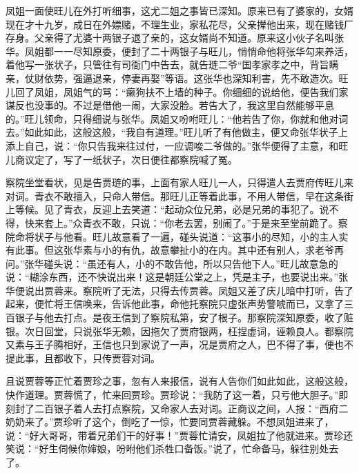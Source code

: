 凤姐一面使旺儿在外打听细事，这尤二姐之事皆已深知。原来已有了婆家的，女婿现在才十九岁，成日在外嫖赌，不理生业，家私花尽，父亲撵他出来，现在赌钱厂存身。父亲得了尤婆十两银子退了亲的，这女婿尚不知道。原来这小伙子名叫张华。凤姐都一一尽知原委，便封了二十两银子与旺儿，悄悄命他将张华勾来养活，着他写一张状子，只管往有司衙门中告去，就告琏二爷“国孝家孝之中，背旨瞒亲，仗财依势，强逼退亲，停妻再娶”等语。这张华也深知利害，先不敢造次。旺儿回了凤姐，凤姐气的骂：“癞狗扶不上墙的种子。你细细的说给他，便告我们家谋反也没事的。不过是借他一闹，大家没脸。若告大了，我这里自然能够平息的。”旺儿领命，只得细说与张华。凤姐又吩咐旺儿：“他若告了你，你就和他对词去。”如此如此，这般这般，“我自有道理。”旺儿听了有他做主，便又命张华状子上添上自己，说：“你只告我来往过付，一应调唆二爷做的。”张华便得了主意，和旺儿商议定了，写了一纸状子，次日便往都察院喊了冤。

察院坐堂看状，见是告贾琏的事，上面有家人旺儿一人，只得遣人去贾府传旺儿来对词。青衣不敢擅入，只命人带信。那旺儿正等着此事，不用人带信，早在这条街上等候。见了青衣，反迎上去笑道：“起动众位兄弟，必是兄弟的事犯了。说不得，快来套上。”众青衣不敢，只说：“你老去罢，别闹了。”于是来至堂前跪了。察院命将状子与他看。旺儿故意看了一遍，碰头说道：“这事小的尽知，小的主人实有此事。但这张华素与小的有仇，故意攀扯小的在内。其中还有别人，求老爷再问。”张华碰头说：“虽还有人，小的不敢告他，所以只告他下人。”旺儿故意急的说：“糊涂东西，还不快说出来！这是朝廷公堂之上，凭是主子，也要说出来。”张华便说出贾蓉来。察院听了无法，只得去传贾蓉。凤姐又差了庆儿暗中打听，告了起来，便忙将王信唤来，告诉他此事，命他托察院只虚张声势警唬而已，又拿了三百银子与他去打点。是夜王信到了察院私第，安了根子。那察院深知原委，收了赃银。次日回堂，只说张华无赖，因拖欠了贾府银两，枉捏虚词，诬赖良人。都察院又素与王子腾相好，王信也只到家说了一声，况是贾府之人，巴不得了事，便也不提此事，且都收下，只传贾蓉对词。

且说贾蓉等正忙着贾珍之事，忽有人来报信，说有人告你们如此如此，这般这般，快作道理。贾蓉慌了，忙来回贾珍。贾珍说：“我防了这一着，只亏他大胆子。”即刻封了二百银子着人去打点察院，又命家人去对词。正商议之间，人报：“西府二奶奶来了。”贾珍听了这个，倒吃了一惊，忙要同贾蓉藏躲。不想凤姐进来了，说：“好大哥哥，带着兄弟们干的好事！”贾蓉忙请安，凤姐拉了他就进来。贾珍还笑说：“好生伺候你婶娘，吩咐他们杀牲口备饭。”说了，忙命备马，躲往别处去了。

